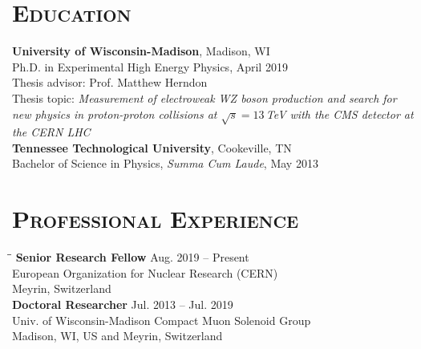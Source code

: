 \documentclass[10pt]{res} %
\begin{document}

\address{{\bf Current Address} \\  CERN B40/2-A20 \\  Geneva 23 \\ Switzerland \\ Tel: +41 77 501 95 13 }
\address{}

\begin{resume}
\section{\textsc{Education}}
  \textbf{University of Wisconsin-Madison}, Madison, WI \\
Ph.D. in Experimental High Energy Physics, April 2019 \\
  Thesis advisor: Prof. Matthew Herndon \\
    Thesis topic: \emph{Measurement of electroweak WZ boson production and search for new physics in proton-proton collisions at $\sqrt{s}=13$\,TeV with the CMS detector at the CERN LHC} \\
  \textbf{Tennessee Technological University}, Cookeville, TN \\
Bachelor of Science in Physics, \textit{Summa Cum Laude}, May 2013

\section{\textsc{Professional Experience}}
\vspace{-0.1in}
\begin{tabbing}
\hspace{2.3in}\= \hspace{2.4in}\= \kill %
{\bf Senior Research Fellow} \>\> Aug. 2019 -- Present \\
European Organization for Nuclear Research (CERN)   \\  Meyrin, Switzerland \\
{\bf Doctoral Researcher} \>\> Jul. 2013 -- Jul. 2019\\
Univ. of Wisconsin-Madison Compact Muon Solenoid Group \\  Madison, WI, US and Meyrin, Switzerland \\
\end{tabbing}\vspace{-20pt}      %


\end{resume}
\end{document}
